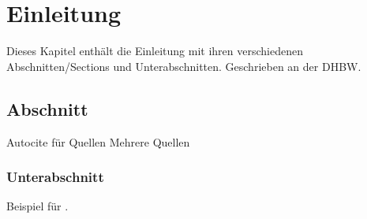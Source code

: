\chapter{Einleitung}

Dieses Kapitel enthält die Einleitung mit ihren verschiedenen Abschnitten/Sections und
Unterabschnitten. Geschrieben an der \ac{DHBW}.

\section{Abschnitt}

Autocite für Quellen \autocite[Vgl.][S. 42]{ME12}
Mehrere Quellen \cites[Vgl.][S. 10]{ME12}[Vgl.][S. 100]{TD15} 

\subsection{Unterabschnitt}

Beispiel für .
\lipsum 
